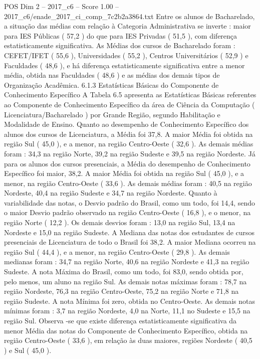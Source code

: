 \begin{textsample}{POS Dim 2 – 2017\_c6 – Score 1.00 – 2017\_c6/enade\_2017\_ci\_comp\_7c2b2a3864.txt}
Entre os alunos de Bacharelado, a situação das médias com relação à Categoria Administrativa se inverte : maior para IES Públicas ( 57,2 ) do que para IES Privadas ( 51,5 ), com diferença estatisticamente significativa.
As Médias dos cursos de Bacharelado foram : CEFET/IFET ( 55,6 ), Universidades ( 55,2 ), Centros Universitários ( 52,9 ) e Faculdades ( 48,6 ), e há diferença estatisticamente significativa entre a menor média, obtida nas Faculdades ( 48,6 ) e as médias dos demais tipos de Organização Acadêmica. 6.1.3 Estatísticas Básicas do Componente de Conhecimento Específico A Tabela 6.5 apresenta as Estatísticas Básicas referentes ao Componente de Conhecimento Específico da área de Ciência da Computação ( Licenciatura/Bacharelado ) por Grande Região, segundo Habilitação e Modalidade de Ensino.
Quanto ao desempenho de Conhecimento Específico dos alunos dos cursos de Licenciatura, a Média foi 37,8.
A maior Média foi obtida na região Sul ( 45,0 ), e a menor, na região Centro-Oeste ( 32,6 ).
As demais médias foram : 34,3 na região Norte, 39,2 na região Sudeste e 39,5 na região Nordeste.
Já para os alunos dos cursos presenciais, a Média do desempenho de Conhecimento Específico foi maior, 38,2.
A maior Média foi obtida na região Sul ( 45,0 ), e a menor, na região Centro-Oeste ( 33,6 ).
As demais médias foram : 40,5 na região Nordeste, 40,4 na região Sudeste e 34,7 na região Nordeste.
Quanto à variabilidade das notas, o Desvio padrão do Brasil, como um todo, foi 14,4, sendo o maior Desvio padrão observado na região Centro-Oeste ( 16,8 ), e o menor, na região Norte ( 12,2 ).
Os demais desvios foram : 13,0 na região Sul, 13,4 na Nordeste e 15,0 na região Sudeste.
A Mediana das notas dos estudantes de cursos presenciais de Licenciatura de todo o Brasil foi 38,2.
A maior Mediana ocorreu na região Sul ( 44,4 ), e a menor, na região Centro-Oeste ( 29,8 ).
As demais medianas foram : 34,7 na região Norte, 40,6 na região Nordeste e 41,3 na região Sudeste.
A nota Máxima do Brasil, como um todo, foi 83,0, sendo obtida por, pelo menos, um aluno na região Sul.
As demais notas máximas foram : 78,7 na região Nordeste, 76,3 na região Centro-Oeste, 75,2 na região Norte e 71,8 na região Sudeste.
A nota Mínima foi zero, obtida no Centro-Oeste.
As demais notas mínimas foram : 3,7 na região Nordeste, 4,0 na Norte, 11,1 no Sudeste e 15,5 na região Sul.
Observa -se que existe diferença estatisticamente significativa da menor Média das notas do Componente de Conhecimento Específico, obtida na região Centro-Oeste ( 33,6 ), em relação às duas maiores, regiões Nordeste ( 40,5 ) e Sul ( 45,0 ).

\end{textsample}
